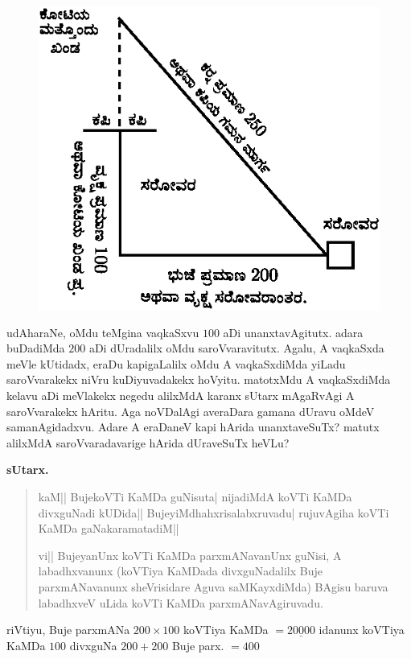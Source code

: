 \begin{figure}[H]
\centering
\includegraphics{figure/fig28.eps}
\end{figure}

udAharaNe, oMdu teMgina vaqkaSxvu $100$ aDi unanxtavAgitutx. adara
buDadiMda $200$ aDi dUradalilx oMdu saroVvaravitutx. Agalu, A
vaqkaSxda meVle kUtidadx, eraDu kapigaLalilx oMdu A vaqkaSxdiMda
yiLadu saroVvarakekx niVru kuDiyuvadakekx hoVyitu. matotxMdu A
vaqkaSxdiMda kelavu aDi meVlakekx negedu alilxMdA karanx sUtarx
mAgaRvAgi A saroVvarakekx hAritu. Aga noVDalAgi averaDara gamana
dUravu oMdeV samanAgidadxvu. Adare A eraDaneV kapi hArida
unanxtaveSuTx? matutx alilxMdA saroVvaradavarige hArida dUraveSuTx
heVLu?

\begin{center}
{\large\bf sUtarx.}
\end{center}

\begin{verse}
kaM|| BujekoVTi KaMDa guNisuta| nijadiMdA koVTi KaMDa divxguNadi
kUDida|| BujeyiMdhahxri\-salabxruvadu| rujuvAgiha koVTi KaMDa
gaNakaramatadiM||

vi|| BujeyanUnx koVTi KaMDa parxmANavanUnx guNisi, A labadhxvanunx
(koVTiya KaMDada divxguNadalilx Buje parxmANavanunx sheVrisidare Aguva
saMKayxdiMda) BAgisu baruva labadhxveV uLida koVTi KaMDa
parxmANavAgiruvadu. 
\end{verse}

riVtiyu, Buje parxmANa $200\times 100$ koVTiya KaMDa
$=\underline{20000}$ idanunx koVTiya KaMDa $100$ divxguNa $200+200$
Buje parx. $=400$

